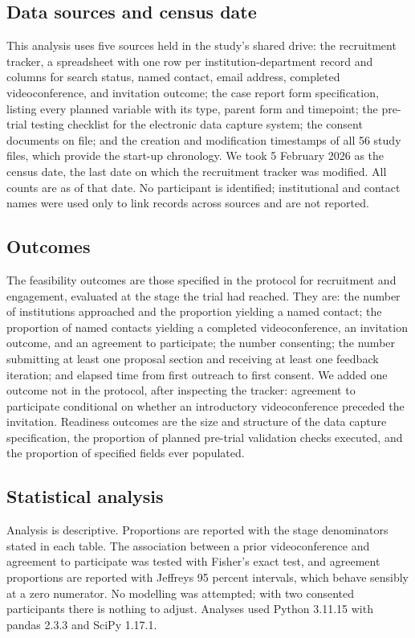 \documentclass[11pt,a4paper]{article}
\begin{document}
\subsection{Data sources and census date}

This analysis uses five sources held in the study's shared drive: the recruitment tracker, a spreadsheet with one row per institution-department record and columns for search status, named contact, email address, completed videoconference, and invitation outcome; the case report form specification, listing every planned variable with its type, parent form and timepoint; the pre-trial testing checklist for the electronic data capture system; the consent documents on file; and the creation and modification timestamps of all 56 study files, which provide the start-up chronology. We took 5 February 2026 as the census date, the last date on which the recruitment tracker was modified. All counts are as of that date. No participant is identified; institutional and contact names were used only to link records across sources and are not reported.

\subsection{Outcomes}

The feasibility outcomes are those specified in the protocol for recruitment and engagement, evaluated at the stage the trial had reached. They are: the number of institutions approached and the proportion yielding a named contact; the proportion of named contacts yielding a completed videoconference, an invitation outcome, and an agreement to participate; the number consenting; the number submitting at least one proposal section and receiving at least one feedback iteration; and elapsed time from first outreach to first consent. We added one outcome not in the protocol, after inspecting the tracker: agreement to participate conditional on whether an introductory videoconference preceded the invitation. Readiness outcomes are the size and structure of the data capture specification, the proportion of planned pre-trial validation checks executed, and the proportion of specified fields ever populated.

\subsection{Statistical analysis}

Analysis is descriptive. Proportions are reported with the stage denominators stated in each table. The association between a prior videoconference and agreement to participate was tested with Fisher's exact test, and agreement proportions are reported with Jeffreys 95 percent intervals, which behave sensibly at a zero numerator. No modelling was attempted; with two consented participants there is nothing to adjust. Analyses used Python 3.11.15 with pandas 2.3.3 and SciPy 1.17.1.
\end{document}
